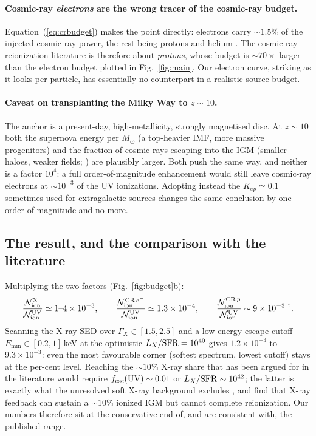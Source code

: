 \documentclass[11pt,a4paper]{article}
\begin{document}
\paragraph{Cosmic-ray \emph{electrons} are the wrong tracer of the cosmic-ray
budget.} Equation~(\ref{eq:crbudget}) makes the point directly: electrons
carry $\sim1.5\%$ of the injected cosmic-ray power, the rest being protons
and helium \citep{strong10,gesseyjones23}. The cosmic-ray reionization
literature \citep{sazonov15,leite17} is therefore about \emph{protons}, whose
budget is $\sim70\times$ larger than the electron budget plotted in
Fig.~\ref{fig:main}. Our electron curve, striking as it looks per particle,
has essentially no counterpart in a realistic source budget.

\paragraph{Caveat on transplanting the Milky Way to $z\sim10$.}
The anchor is a present-day, high-metallicity, strongly magnetised disc. At
$z\sim10$ both the supernova energy per $M_\odot$ (a top-heavier IMF, more
massive progenitors) and the fraction of cosmic rays escaping into the IGM
(smaller haloes, weaker fields; \citealt{leite17}) are plausibly larger. Both
push the same way, and neither is a factor $10^{4}$: a full order-of-magnitude
enhancement would still leave cosmic-ray electrons at $\sim10^{-3}$ of the UV
ionizations. Adopting instead the $K_{ep}\simeq0.1$ sometimes used for
extragalactic sources \citep{merten17} changes the same conclusion by one
order of magnitude and no more.

\subsection{The result, and the comparison with the literature}

Multiplying the two factors (Fig.~\ref{fig:budget}b):
\begin{equation}
  \frac{\mathcal{N}_{\rm ion}^{\rm X}}{\mathcal{N}_{\rm ion}^{\rm UV}}
  \simeq 1\text{--}4\times10^{-3},
  \qquad
  \frac{\mathcal{N}_{\rm ion}^{{\rm CR}\,e^-}}{\mathcal{N}_{\rm ion}^{\rm UV}}
  \simeq 1.3\times10^{-4},
  \qquad
  \frac{\mathcal{N}_{\rm ion}^{{\rm CR}\,p}}{\mathcal{N}_{\rm ion}^{\rm UV}}
  \sim 9\times10^{-3}\;^{\dagger} .
\end{equation}
Scanning the X-ray SED over $\Gamma_X\in[1.5,2.5]$ and a low-energy escape
cutoff $E_{\min}\in[0.2,1]\,$keV at the optimistic
$L_X/{\rm SFR}=10^{40}$ gives $1.2\times10^{-3}$ to $9.3\times10^{-3}$: even
the most favourable corner (softest spectrum, lowest cutoff) stays at the
per-cent level. Reaching the $\sim10\%$ X-ray share that has been argued for
in the literature would require $f_{\rm esc}({\rm UV})\sim0.01$ or
$L_X/{\rm SFR}\sim10^{42}$; the latter is exactly what the unresolved soft
X-ray background excludes \citep{mcquinn12}, and
\citet{mesinger13} find that X-ray feedback can sustain a $\sim10\%$ ionized
IGM but cannot complete reionization. Our numbers therefore sit at the
conservative end of, and are consistent with, the published range.
\end{document}
